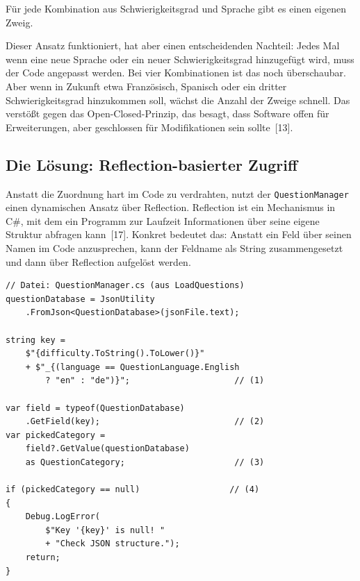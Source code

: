 \documentclass[12pt,a4paper]{article}
\begin{document}
\begin{description}[leftmargin=2em, labelwidth=1.5em]
    \item[(1--4)] Für jede Kombination aus Schwierigkeitsgrad und Sprache gibt es einen eigenen Zweig.
\end{description}

Dieser Ansatz funktioniert, hat aber einen entscheidenden Nachteil: Jedes Mal wenn eine neue Sprache oder ein neuer Schwierigkeitsgrad hinzugefügt wird, muss der Code angepasst werden. Bei vier Kombinationen ist das noch überschaubar. Aber wenn in Zukunft etwa Französisch, Spanisch oder ein dritter Schwierigkeitsgrad hinzukommen soll, wächst die Anzahl der Zweige schnell. Das verstößt gegen das Open-Closed-Prinzip, das besagt, dass Software offen für Erweiterungen, aber geschlossen für Modifikationen sein sollte~[13].

\subsection{Die Lösung: Reflection-basierter Zugriff}

Anstatt die Zuordnung hart im Code zu verdrahten, nutzt der \texttt{QuestionManager} einen dynamischen Ansatz über Reflection. Reflection ist ein Mechanismus in C\#, mit dem ein Programm zur Laufzeit Informationen über seine eigene Struktur abfragen kann~[17]. Konkret bedeutet das: Anstatt ein Feld über seinen Namen im Code anzusprechen, kann der Feldname als String zusammengesetzt und dann über Reflection aufgelöst werden.

\begin{lstlisting}
// Datei: QuestionManager.cs (aus LoadQuestions)
questionDatabase = JsonUtility
    .FromJson<QuestionDatabase>(jsonFile.text);

string key =
    $"{difficulty.ToString().ToLower()}"
    + $"_{(language == QuestionLanguage.English
        ? "en" : "de")}";                     // (1)

var field = typeof(QuestionDatabase)
    .GetField(key);                           // (2)
var pickedCategory =
    field?.GetValue(questionDatabase)
    as QuestionCategory;                      // (3)

if (pickedCategory == null)                  // (4)
{
    Debug.LogError(
        $"Key '{key}' is null! "
        + "Check JSON structure.");
    return;
}
\end{lstlisting}
\end{document}

